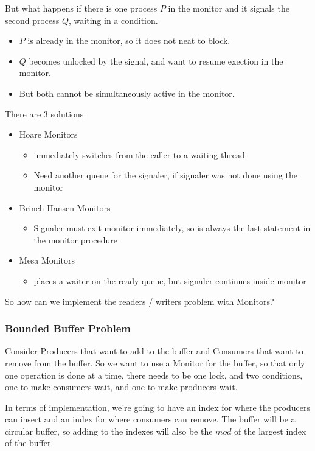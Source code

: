 \documentclass{article}
\begin{document}
But what happens if there is one process $P$ in the monitor and it signals the second process $Q$, waiting in a condition.
\begin{itemize}
  \item $P$ is already in the monitor, so it does not neat to block.
  \item $Q$ becomes unlocked by the signal, and want to resume exection in the monitor.
  \item But both cannot be simultaneously active in the monitor.
\end{itemize}

There are 3 solutions
\begin{itemize}
  \item Hoare Monitors
  \begin{itemize}
    \item {} immediately switches from the caller to a waiting thread
    \item Need another queue for the signaler, if signaler was not done using the monitor
  \end{itemize}
  \item Brinch Hansen Monitors
  \begin{itemize}
    \item Signaler must exit monitor immediately, so  is always the last statement in the monitor procedure
  \end{itemize}
  \item Mesa Monitors
  \begin{itemize}
    \item {} places a waiter on the ready queue, but signaler continues inside monitor
  \end{itemize}
\end{itemize}

So how can we implement the readers / writers problem with Monitors?

\subsubsection{Bounded Buffer Problem}

Consider Producers that want to add to the buffer and Consumers that want to remove from the buffer. So we want to use a Monitor for the buffer, so that only one operation is done at a time, there needs to be one lock, and two conditions, one to make consumers wait, and one to make producers wait.

In terms of implementation, we're going to have an index for where the producers can insert and an index for where consumers can remove. The buffer will be a circular buffer, so adding to the indexes will also be the $mod$ of the largest index of the buffer.
\end{document}
